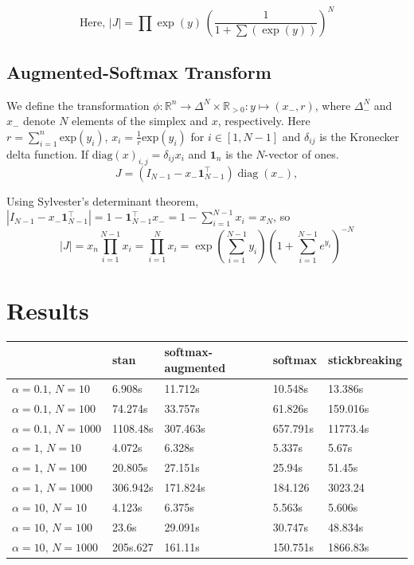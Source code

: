 \documentclass[11pt]{article}
\newcommand{\abs}[1]{\left| #1 \right|}
\begin{document}
\[
\textrm{Here, } \abs{J} = \prod \exp(y)
  \, \left( \frac{1}{1 + \sum(\exp(y))} \right)^N
\]
\subsection{Augmented-Softmax Transform}
We define the transformation
$\phi: \mathbb{R}^n \to \Delta^{N} \times \mathbb{R}_{>0}: y \mapsto
(x_-, r)$, where  $\Delta_{-}^N$ and $x_{-}$  denote $N$ elements of the simplex and $x$, respectively. Here $r = \sum_{i=1}^n \textrm{exp}(y_i)$,
$x_i = \frac{1}{r} \textrm{exp}(y_i)$ for $i \in [1, N-1]$ and $\delta_{ij}$ is the Kronecker delta function. If $\mathrm{diag}(x)_{i, j} = \delta_{ij} x_i$ and $\boldsymbol{1}_n$ is the $N$-vector of ones.\[
  J = (I_{N-1} - x_- \boldsymbol{1}_{N-1}^\top) \operatorname{diag}(x_-),
\] 

Using Sylvester's determinant theorem,
$|I_{N-1} - x_- \boldsymbol{1}_{N-1}^\top| = 1 -
\boldsymbol{1}_{N-1}^\top x_- = 1 - \sum_{i=1}^{N-1} x_i = x_N$, so
$$ |J| = x_n \prod_{i=1}^{N-1} x_i = \prod_{i=1}^{N} x_i = \exp\left(\sum_{i=1}^{N-1} y_i\right) \left(1 + \sum_{i=1}^{N-1} e^{y_i}\right)^{-N}$$

\section{Results}

\begin{table}[!ht]
    \centering
    \begin{tabular}{|l|l|l|l|l|}
    \hline
        ~ & stan & softmax-augmented & softmax & stickbreaking \\ \hline
        $\alpha = 0.1, \, N = 10$ & 6.908s & 11.712s & 10.548s & 13.386s \\ 
        $\alpha = 0.1, \, N = 100$ & 74.274s & 33.757s & 61.826s & 159.016s \\ 
        $\alpha = 0.1, \, N = 1000$ & 1108.48s & 307.463s & 657.791s & 11773.4s \\ 
        $\alpha = 1, \, N = 10$ & 4.072s & 6.328s & 5.337s & 5.67s \\ 
        $\alpha = 1, \, N = 100$ & 20.805s & 27.151s & 25.94s & 51.45s \\ 
        $\alpha = 1, \, N = 1000$ & 306.942s & 171.824s & 184.126 & 3023.24 \\ 
        $\alpha = 10, \, N = 10$ & 4.123s & 6.375s & 5.563s & 5.606s \\ 
        $\alpha = 10, \, N = 100$ & 23.6s & 29.091s & 30.747s & 48.834s \\ 
        $\alpha = 10, \, N = 1000$ & 205s.627 & 161.11s & 150.751s & 1866.83s \\ \hline
    \end{tabular}
\end{table}
\end{document}
